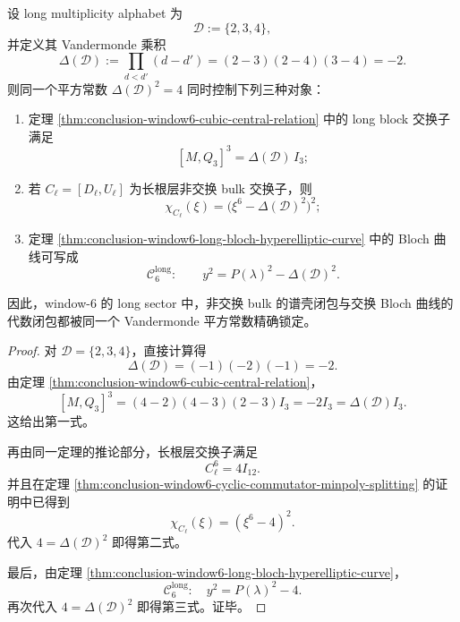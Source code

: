 \begin{theorem}\label{thm:conclusion-window6-vandermonde-square-control-law}
设 long multiplicity alphabet 为
\[
\mathcal D:=\{2,3,4\},
\]
并定义其 Vandermonde 乘积
\[
\Delta(\mathcal D):=\prod_{d<d'}(d-d')=(2-3)(2-4)(3-4)=-2.
\]
则同一个平方常数 \(\Delta(\mathcal D)^2=4\) 同时控制下列三种对象：
\begin{enumerate}
  \item 定理 \ref{thm:conclusion-window6-cubic-central-relation} 中的 long block 交换子满足
  \[
  [M,Q_3]^3=\Delta(\mathcal D)\,I_3;
  \]
  \item 若 \(C_{\ell}=[D_{\ell},U_{\ell}]\) 为长根层非交换 bulk 交换子，则
  \[
  \chi_{C_{\ell}}(\xi)=\bigl(\xi^6-\Delta(\mathcal D)^2\bigr)^2;
  \]
  \item 定理 \ref{thm:conclusion-window6-long-bloch-hyperelliptic-curve} 中的 Bloch 曲线可写成
  \[
  \mathcal C_6^{\mathrm{long}}:\qquad
  y^2=P(\lambda)^2-\Delta(\mathcal D)^2.
  \]
\end{enumerate}
因此，window-\(6\) 的 long sector 中，非交换 bulk 的谱壳闭包与交换 Bloch 曲线的代数闭包都被同一个 Vandermonde 平方常数精确锁定。
\end{theorem}
\begin{proof}
对 \(\mathcal D=\{2,3,4\}\)，直接计算得
\[
\Delta(\mathcal D)=(-1)(-2)(-1)=-2.
\]
由定理 \ref{thm:conclusion-window6-cubic-central-relation}，
\[
[M,Q_3]^3=(4-2)(4-3)(2-3)I_3=-2I_3=\Delta(\mathcal D)I_3.
\]
这给出第一式。

再由同一定理的推论部分，长根层交换子满足
\[
C_{\ell}^6=4I_{12}.
\]
并且在定理 \ref{thm:conclusion-window6-cyclic-commutator-minpoly-splitting} 的证明中已得到
\[
\chi_{C_{\ell}}(\xi)=(\xi^6-4)^2.
\]
代入 \(4=\Delta(\mathcal D)^2\) 即得第二式。

最后，由定理 \ref{thm:conclusion-window6-long-bloch-hyperelliptic-curve}，
\[
\mathcal C_6^{\mathrm{long}}:\quad y^2=P(\lambda)^2-4.
\]
再次代入 \(4=\Delta(\mathcal D)^2\) 即得第三式。证毕。
\end{proof}

